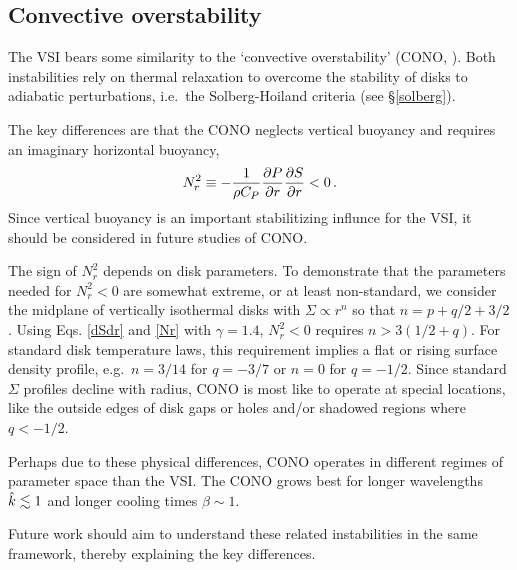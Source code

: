 \subsection{Convective overstability}
The VSI bears some similarity to the `convective overstability'
 (CONO, \citealp{klahr14, lyra14}).   Both instabilities rely on thermal relaxation to 
overcome the stability of disks to adiabatic perturbations, i.e.\ the Solberg-Hoiland
criteria (see \S\ref{solberg}).

The key differences are that the CONO neglects vertical buoyancy
and requires an imaginary horizontal buoyancy,
\begin{align}\label{Nr}
N_r^2 \equiv -{1 \over \rho C_P}{\partial P \over \partial r} {\partial S \over \partial r} < 0\, .
\end{align}
Since vertical buoyancy is an important stabilitizing influnce for the VSI, it should
be considered in future studies of CONO.

The sign of $N_r^2$ depends on disk parameters.  To demonstrate that the parameters needed for $N_r^2 <0$
are somewhat extreme, or at least non-standard, we consider the midplane of vertically isothermal disks with 
$\Sigma \propto r^n$ so that $n = p+q/2 + 3/2$. Using Eqs. \ref{dSdr} and \ref{Nr} with $\gamma = 1.4$,
$N_r^2 < 0$ requires $n> 3(1/2 + q)$.  For standard disk temperature laws, this requirement implies
a flat or rising surface density profile, e.g.\ $n = 3/14$ for $q = -3/7$ or $n = 0$ for $q = -1/2$.
Since standard $\Sigma$ profiles decline with radius, CONO is most like to operate at 
special locations, like the outside edges of disk gaps or holes and/or shadowed regions where $q < -1/2$.

Perhaps due to these physical differences, CONO operates in different regimes of parameter
space than the VSI.  The CONO grows best for longer wavelengths $\hat{k} \lesssim 1$ and longer 
cooling times $\beta \sim 1$. 

Future work should aim to understand these related instabilities in the same framework, thereby 
explaining the key differences.




